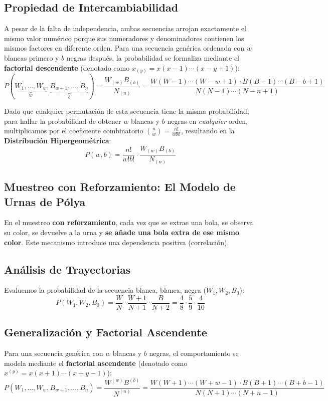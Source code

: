 \subsection*{Propiedad de Intercambiabilidad}
A pesar de la falta de independencia, ambas secuencias arrojan exactamente el mismo valor numérico porque sus numeradores y denominadores contienen los mismos factores en diferente orden. Para una secuencia genérica ordenada con $w$ blancas primero y $b$ negras después, la probabilidad se formaliza mediante el \textbf{factorial descendente} (denotado como $x_{(y)} = x(x-1)\cdots(x-y+1)$):
\begin{equation}
    P(\underbrace{W_1, \dots, W_w}_{w}, \underbrace{B_{w+1}, \dots, B_n}_{b}) = \frac{W_{(w)} B_{(b)}}{N_{(n)}} = \frac{W(W-1)\cdots(W-w+1) \cdot B(B-1)\cdots(B-b+1)}{N(N-1)\cdots(N-n+1)}
\end{equation}

Dado que cualquier permutación de esta secuencia tiene la misma probabilidad, para hallar la probabilidad de obtener $w$ blancas y $b$ negras en \textit{cualquier} orden, multiplicamos por el coeficiente combinatorio $\binom{n}{w} = \frac{n!}{w!b!}$, resultando en la \textbf{Distribución Hipergeométrica}:
\begin{equation}
    P(w, b) = \frac{n!}{w!b!} \cdot \frac{W_{(w)} B_{(b)}}{N_{(n)}}
\end{equation}


\subsection{Muestreo con Reforzamiento: El Modelo de Urnas de Pólya}

En el muestreo \textbf{con reforzamiento}, cada vez que se extrae una bola, se observa su color, se devuelve a la urna y \textbf{se añade una bola extra de ese mismo color}. Este mecanismo introduce una dependencia positiva (correlación).

\subsection*{Análisis de Trayectorias}
Evaluemos la probabilidad de la secuencia blanca, blanca, negra ($W_1, W_2, B_3$):
\begin{equation}
    P(W_1, W_2, B_3) = \frac{W}{N} \cdot \frac{W+1}{N+1} \cdot \frac{B}{N+2} = \frac{4}{8} \cdot \frac{5}{9} \cdot \frac{4}{10}
\end{equation}

\subsection*{Generalización y Factorial Ascendente}
Para una secuencia genérica con $w$ blancas y $b$ negras, el comportamiento se modela mediante el \textbf{factorial ascendente} (denotado como $x^{(y)} = x(x+1)\cdots(x+y-1)$):
\begin{equation}
    P(W_1, \dots, W_w, B_{w+1}, \dots, B_n) = \frac{W^{(w)} B^{(b)}}{N^{(n)}}= \frac{W(W+1)\cdots(W+w-1) \cdot B(B+1)\cdots(B+b-1)}{N(N+1)\cdots(N+n-1)}
\end{equation}

